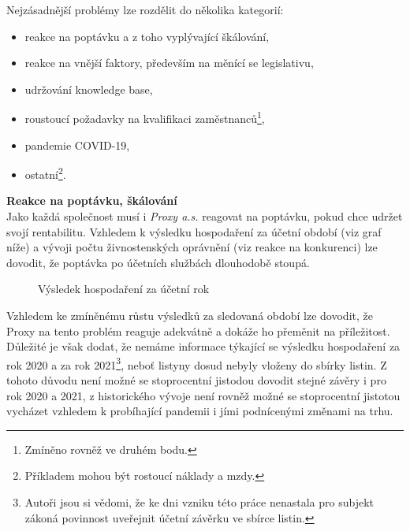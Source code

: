 Nejzásadnější problémy lze rozdělit do několika kategorií:\\

\begin{itemize}
	\item reakce na poptávku a z toho vyplývající škálování,
	\item reakce na vnější faktory, především na měnící se legislativu,
	\item udržování knowledge base,
	\item roustoucí požadavky na kvalifikaci zaměstnanců\footnote{Zmíněno rovněž ve druhém bodu.},
	\item pandemie COVID-19,
	\item ostatní\footnote{Příkladem mohou být rostoucí náklady a mzdy.}.
\end{itemize}

\vspace*{5mm}

\newpage

\textbf{Reakce na poptávku, škálování}\\

Jako každá společnost musí i \textit{Proxy a.s.} reagovat na poptávku, pokud chce udržet svojí rentabilitu. Vzhledem k výsledku hospodaření za účetní období (viz graf níže) a vývoji počtu živnostenských oprávnění (viz reakce na konkurenci) lze dovodit, že poptávka po účetních službách dlouhodobě stoupá.

\begin{figure}[!htbp]
	\caption[Výsledek hospodaření za účetní rok]{Výsledek hospodaření za účetní rok}
	\label{fig:Vysledek hospodareni}
\end{figure}

Vzhledem ke zmíněnému růstu výsledků za sledovaná období lze dovodit, že Proxy na tento problém reaguje adekvátně a dokáže ho přeměnit na příležitost.\\

Důležité je však dodat, že nemáme informace týkající se výsledku hospodaření za rok 2020 a za rok 2021\footnote{Autoři jsou si vědomi, že ke dni vzniku této práce nenastala pro subjekt zákoná povinnost uveřejnit účetní závěrku ve sbírce listin.}, neboť listyny dosud nebyly vloženy do sbírky listin. Z tohoto důvodu není možné se stoprocentní jistodou dovodit stejné závěry i pro rok 2020 a 2021, z historického vývoje není rovněž možné se stoprocentní jistotou vycházet vzhledem k probíhající pandemii i jími podnícenými změnami na trhu.\\

